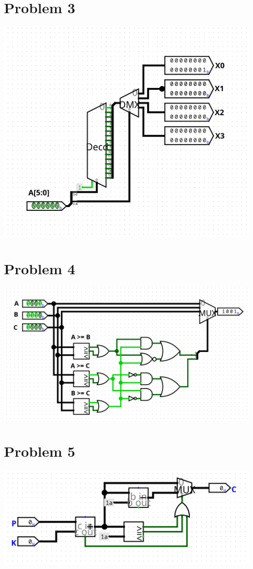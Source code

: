 \documentclass[12pt]{article}
\begin{document}
\section*{Problem 3}
\begin{center}
   \includegraphics[scale=0.25]{Problem3.png}
\end{center}
\section*{Problem 4}
\begin{center}
   \includegraphics[scale=0.25]{Problem4.png}
\end{center}
\section*{Problem 5}
\begin{center}
   \includegraphics[scale=0.25]{Problem5.png}
\end{center}
\end{document}
